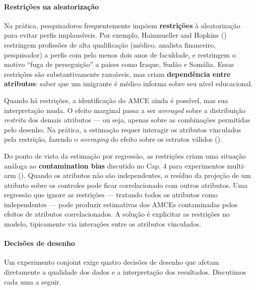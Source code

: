 \documentclass[
]{article}
\begin{document}
\paragraph{Restrições na aleatorização}\label{restriuxe7uxf5es-na-aleatorizauxe7uxe3o}

Na prática, pesquisadores frequentemente impõem \textbf{restrições} à aleatorização para evitar perfis implausíveis. Por exemplo, Hainmueller and Hopkins () restringem profissões de alta qualificação (médico, analista financeiro, pesquisador) a perfis com pelo menos dois anos de faculdade, e restringem o motivo ``fuga de perseguição'' a países como Iraque, Sudão e Somália. Essas restrições são substantivamente razoáveis, mas criam \textbf{dependência entre atributos}: saber que um imigrante é médico informa sobre seu nível educacional.

Quando há restrições, a identificação do AMCE ainda é possível, mas sua interpretação muda. O efeito marginal passa a ser \emph{averaged} sobre a distribuição \emph{restrita} dos demais atributos --- ou seja, apenas sobre as combinações permitidas pelo desenho. Na prática, a estimação requer interagir os atributos vinculados pela restrição, fazendo o \emph{averaging} do efeito sobre os estratos válidos ().

Do ponto de vista da estimação por regressão, as restrições criam uma situação análoga ao \textbf{contamination bias} discutido no Cap. 4 para experimentos multi-arm (). Quando os atributos não são independentes, o resíduo da projeção de um atributo sobre os controles pode ficar correlacionado com outros atributos. Uma regressão que ignore as restrições --- tratando todos os atributos como independentes --- pode produzir estimativas dos AMCEs contaminadas pelos efeitos de atributos correlacionados. A solução é explicitar as restrições no modelo, tipicamente via interações entre os atributos vinculados.

\paragraph{Decisões de desenho}\label{decisuxf5es-de-desenho}

Um experimento conjoint exige quatro decisões de desenho que afetam diretamente a qualidade dos dados e a interpretação dos resultados. Discutimos cada uma a seguir.
\end{document}

